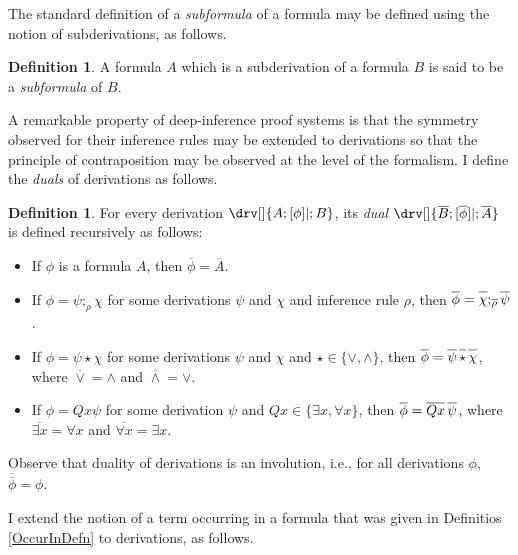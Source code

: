 \documentclass[10pt]{article}
\theoremstyle{definition}\newtheorem{remark}[theorem]{Remark}
\theoremstyle{definition}\newtheorem{example}[theorem]{Example}
\theoremstyle{definition}\newtheorem{definition}[theorem]{Definition}
\newcommand{\compByInf}[1]{;_{#1}}
\begin{document}
	The standard definition of a \textit{subformula} of a formula may be defined using the notion of subderivations, as follows.
	
	\begin{definition}
		A formula $A$ which is a subderivation of a formula $B$ is said to be a \textit{subformula} of $B$.
	\end{definition}
	
	A remarkable property of deep-inference proof systems is that the symmetry observed for their inference rules may be extended to derivations so that the principle of contraposition may be observed at the level of the formalism. I define the \textit{duals} of derivations as follows.

	\begin{definition}\label{DualDerivation}
		For every derivation $\drv[] {A ; [\phi]| ; B}$, its \textit{dual} $\drv[] {\overline{B} ; [\overline{\phi}]| ; \overline{A}}$ is defined recursively as follows:
		
		\begin{itemize}
			\item If $\phi$ is a formula $A$, then $\overline{\phi} = \overline{A}$.
			
			\item If $\phi = \psi \compByInf{\rho} \chi$ for some derivations $\psi$ and $\chi$ and inference rule $\rho$, then $\overline{\phi} = \overline{\vphantom{\psi}\chi} \compByInf{\overline{\rho}} \overline{\psi}$.
			
			\item If $\phi = \psi \star \chi$ for some derivations $\psi$ and $\chi$ and $\star \in \{\lor, \land\}$, then $\overline{\phi} = \overline{\psi} \, \overline{\vphantom{\psi}\star} \, \overline{\vphantom{\psi}\chi}$, where $\overline{\lor} = \land$ and $\overline{\land} = \lor$.
			
			\item If $\phi = Qx \psi$ for some derivation $\psi$ and $Qx \in \{\exists x, \forall x\}$, then $\overline{\phi} = \overline{\vphantom{\psi}Qx} \, \overline{\psi}$, where $\overline{\exists x} = \forall x$ and $\overline{\forall x} = \exists x$.
		\end{itemize}
	\end{definition}

	Observe that duality of derivations is an involution, i.e., for all derivations $\phi$, $\overline{\overline{\phi}} = \phi$.

	I extend the notion of a term occurring in a formula that was given in Definitios \ref{OccurInDefn} to derivations, as follows.
	
\end{document}
